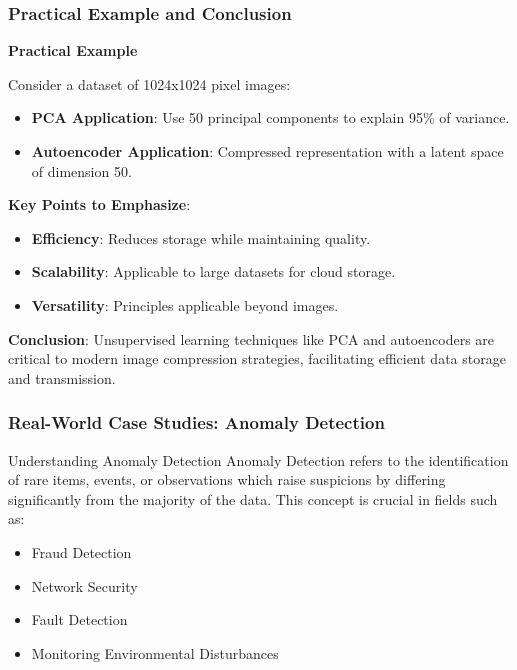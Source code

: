 \documentclass[aspectratio=169]{beamer}
\begin{document}
\begin{frame}[fragile]
    \frametitle{Practical Example and Conclusion}
    \textbf{Practical Example}
    
    Consider a dataset of 1024x1024 pixel images:
    \begin{itemize}
        \item \textbf{PCA Application}: Use 50 principal components to explain 95\% of variance.
        \item \textbf{Autoencoder Application}: Compressed representation with a latent space of dimension 50.
    \end{itemize}

    \textbf{Key Points to Emphasize}:
    \begin{itemize}
        \item \textbf{Efficiency}: Reduces storage while maintaining quality.
        \item \textbf{Scalability}: Applicable to large datasets for cloud storage.
        \item \textbf{Versatility}: Principles applicable beyond images.
    \end{itemize}

    \textbf{Conclusion}: Unsupervised learning techniques like PCA and autoencoders are critical to modern image compression strategies, facilitating efficient data storage and transmission.
\end{frame}

\begin{frame}[fragile]
    \frametitle{Real-World Case Studies: Anomaly Detection}
    \begin{block}{Understanding Anomaly Detection}
        Anomaly Detection refers to the identification of rare items, events, or observations which raise suspicions by differing significantly from the majority of the data. This concept is crucial in fields such as:
        \begin{itemize}
            \item Fraud Detection
            \item Network Security
            \item Fault Detection
            \item Monitoring Environmental Disturbances
        \end{itemize}
    \end{block}
\end{frame}
\end{document}
